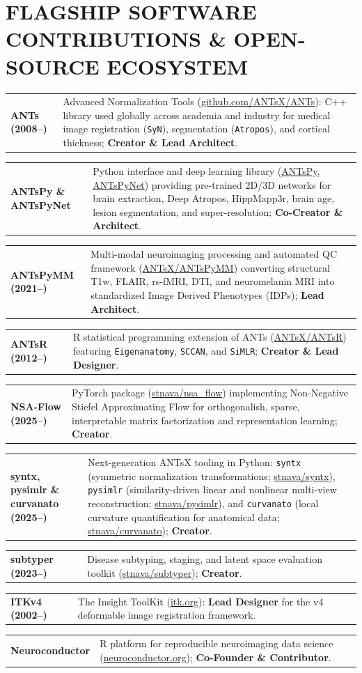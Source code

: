 \documentclass[10pt,letterpaper]{article}
\makeatletter
\newcommand{\cvline}[2]{%
  \noindent\begin{tabularx}{\textwidth}{@{} >{\raggedright\arraybackslash\bfseries\footnotesize\color{accent}}p{1.15in} >{\footnotesize\arraybackslash}X @{}}
    #1 & #2
  \end{tabularx}\par\vspace{2pt}%
}
\makeatother
\begin{document}
\section{FLAGSHIP SOFTWARE CONTRIBUTIONS \& OPEN-SOURCE ECOSYSTEM}
\cvline{ANTs (2008--)}{Advanced Normalization Tools (\href{https://github.com/ANTsX/ANTs}{github.com/ANTsX/ANTs}): C++ library used globally across academia and industry for medical image registration (\texttt{SyN}), segmentation (\texttt{Atropos}), and cortical thickness; \textbf{Creator \& Lead Architect}.}
\cvline{ANTsPy \& ANTsPyNet}{Python interface and deep learning library (\href{https://github.com/ANTsX/ANTsPy}{ANTsPy}, \href{https://github.com/ANTsX/ANTsPyNet}{ANTsPyNet}) providing pre-trained 2D/3D networks for brain extraction, Deep Atropos, HippMapp3r, brain age, lesion segmentation, and super-resolution; \textbf{Co-Creator \& Architect}.}
\cvline{ANTsPyMM (2021--)}{Multi-modal neuroimaging processing and automated QC framework (\href{https://github.com/ANTsX/ANTsPyMM}{ANTsX/ANTsPyMM}) converting structural T1w, FLAIR, rs-fMRI, DTI, and neuromelanin MRI into standardized Image Derived Phenotypes (IDPs); \textbf{Lead Architect}.}
\cvline{ANTsR (2012--)}{R statistical programming extension of ANTs (\href{https://github.com/ANTsX/ANTsR}{ANTsX/ANTsR}) featuring \texttt{Eigenanatomy}, \texttt{SCCAN}, and \texttt{SiMLR}; \textbf{Creator \& Lead Designer}.}
\cvline{NSA-Flow (2025--)}{PyTorch package (\href{https://github.com/stnava/nsa_flow}{stnava/nsa\_flow}) implementing Non-Negative Stiefel Approximating Flow for orthogonalish, sparse, interpretable matrix factorization and representation learning; \textbf{Creator}.}
\cvline{syntx, pysimlr \& curvanato (2025--)}{Next-generation ANTsX tooling in Python: \texttt{syntx} (symmetric normalization transformations; \href{https://github.com/stnava/syntx}{stnava/syntx}), \texttt{pysimlr} (similarity-driven linear and nonlinear multi-view reconstruction; \href{https://github.com/stnava/pysimlr}{stnava/pysimlr}), and \texttt{curvanato} (local curvature quantification for anatomical data; \href{https://github.com/stnava/curvanato}{stnava/curvanato}); \textbf{Creator}.}
\cvline{subtyper (2023--)}{Disease subtyping, staging, and latent space evaluation toolkit (\href{https://github.com/stnava/subtyper}{stnava/subtyper}); \textbf{Creator}.}
\cvline{ITKv4 (2002--)}{The Insight ToolKit (\href{https://itk.org}{itk.org}): \textbf{Lead Designer} for the v4 deformable image registration framework.}
\cvline{Neuroconductor}{R platform for reproducible neuroimaging data science (\href{https://neuroconductor.org}{neuroconductor.org}); \textbf{Co-Founder \& Contributor}.}
\end{document}

